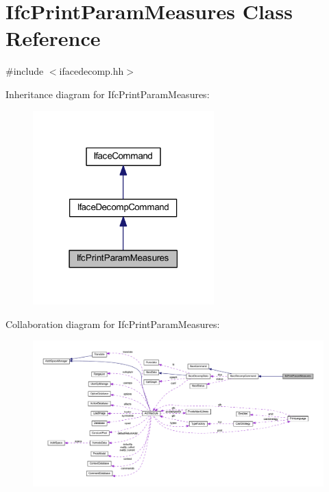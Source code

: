 \hypertarget{class_ifc_print_param_measures}{}\section{Ifc\+Print\+Param\+Measures Class Reference}
\label{class_ifc_print_param_measures}


{\ttfamily \#include $<$ifacedecomp.\+hh$>$}



Inheritance diagram for Ifc\+Print\+Param\+Measures\+:
\nopagebreak
\begin{figure}[H]
\begin{center}
\leavevmode
\includegraphics[width=198pt]{class_ifc_print_param_measures__inherit__graph}
\end{center}
\end{figure}


Collaboration diagram for Ifc\+Print\+Param\+Measures\+:
\nopagebreak
\begin{figure}[H]
\begin{center}
\leavevmode
\includegraphics[width=350pt]{class_ifc_print_param_measures__coll__graph}
\end{center}
\end{figure}
